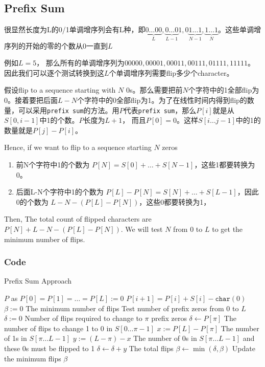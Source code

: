\subsection{Prefix Sum}
\begin{CJK*}{UTF8}{gbsn}
很显然长度为L的0/1单调增序列会有L种，即$\underbrace{0\ldots00}_{L}, \underbrace{0\ldots0}_{L-1}1, 0\underbrace{1\ldots1}_{N-1}, \underbrace{1\ldots1}_{N}$。这些单调增序列的开始的零的个数从0一直到$L$
\par
例如$L=5$， 那么所有的单调增序列为$00000,00001,00011,00111,01111,11111$。因此我们可以逐个测试转换到这$L$个单调增序列需要flip多少个character。
\par
假设flip to a sequence starting with $N$ 0s。那么需要把前$N$个字符中的1全部flip为0。接着要把后面$L-N$个字符中的0全部flip为1。为了在线性时间内得到flip的数量，可以采用\texttt{prefix sum}的方法。用$P$代表\texttt{prefix sum}，那么$P[i]$就是从$S[0,i-1]$中1的个数。$P$长度为$L+1$， 而且$P[0] = 0$。这样$S[i\ldots j-1]$中的1的数量就是$P[j] - P[i]$。
\par
Hence, if we want to flip to a sequence starting $N$ zeros
\begin{enumerate}
\item 前N个字符中1的个数为 $P[N] = S[0] + \ldots +S[N-1]$，这些1都要转换为0。
\item 后面L-N个字符中1的个数为 $P[L] - P[N] = S[N] + \ldots + S[L-1]$，因此0的个数为 $L-N-(P[L]-P[N])$，这些0都要转换为1，
\end{enumerate}
Then, The total count of flipped characters are $P[N] +L - N - (P[L] - P[N])$. We will test $N$ from $0$ to $L$ to get the minimum number of flips.
\end{CJK*}
\subsubsection{Code}
\setcounter{algorithm}{0}
\begin{algorithm}[H]
\caption{Prefix Sum Approach}
\begin{algorithmic}[1]
\State $P$ as $P[0] = P[1] = \ldots = P[L] := 0$
\State $P[i+1] = P[i] + S[i] - \texttt{char}(0)$
\EndFor
\State $\beta:=0$ \Comment The minimum number of flips
 \Comment Test number of prefix zeros from $0$ to $L$
\State $\delta:=0$ \Comment Number of flips required to change to $\pi$ prefix zeros
\State $\delta \gets P[\pi]$ \Comment The number of flips to change 1 to 0 in $S[0\ldots \pi-1]$
\State $x:= P[L] - P[\pi]$ \Comment The number of 1s in $S[\pi\ldots L-1]$
\State $y:= (L-\pi) - x$ \Comment The number of 0s in $S[\pi\ldots L-1]$ and these 0s must be flipped to 1
\State $\delta \gets \delta + y$ \Comment The total flips 
\State $\beta\gets\min(\delta, \beta)$ \Comment Update the minimum flips
\State 
\EndFor
\State \Return $\beta$
\EndProcedure
\end{algorithmic}
\end{algorithm}
